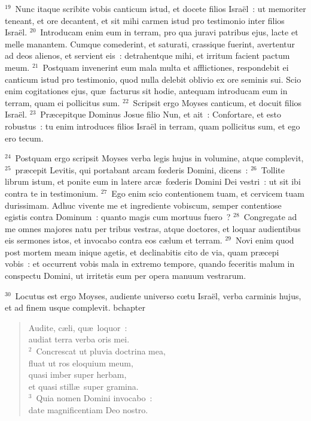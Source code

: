 ${}^{19}$~Nunc itaque scribite vobis canticum istud, et docete filios Isra\"el~: ut memoriter teneant, et ore decantent, et sit mihi carmen istud pro testimonio inter filios Isra\"el.
${}^{20}$~Introducam enim eum in terram, pro qua juravi patribus ejus, lacte et melle manantem. Cumque comederint, et saturati, crassique fuerint, avertentur ad deos alienos, et servient eis~: detrahentque mihi, et irritum facient pactum meum.
${}^{21}$~Postquam invenerint eum mala multa et afflictiones, respondebit ei canticum istud pro testimonio, quod nulla delebit oblivio ex ore seminis sui. Scio enim cogitationes ejus, qu\ae\ facturus sit hodie, antequam introducam eum in terram, quam ei pollicitus sum.
${}^{22}$~Scripsit ergo Moyses canticum, et docuit filios Isra\"el.
${}^{23}$~Pr\ae cepitque Dominus Josue filio Nun, et ait~: Confortare, et esto robustus~: tu enim introduces filios Isra\"el in terram, quam pollicitus sum, et ego ero tecum.


${}^{24}$~Postquam ergo scripsit Moyses verba legis hujus in volumine, atque complevit,
${}^{25}$~pr\ae cepit Levitis, qui portabant arcam fœderis Domini, dicens~:
${}^{26}$~Tollite librum istum, et ponite eum in latere arc\ae\ fœderis Domini Dei vestri~: ut sit ibi contra te in testimonium.
${}^{27}$~Ego enim scio contentionem tuam, et cervicem tuam durissimam. Adhuc vivente me et ingrediente vobiscum, semper contentiose egistis contra Dominum~: quanto magis cum mortuus fuero~?
${}^{28}$~Congregate ad me omnes majores natu per tribus vestras, atque doctores, et loquar audientibus eis sermones istos, et invocabo contra eos c\ae lum et terram.
${}^{29}$~Novi enim quod post mortem meam inique agetis, et declinabitis cito de via, quam pr\ae cepi vobis~: et occurrent vobis mala in extremo tempore, quando feceritis malum in conspectu Domini, ut irritetis eum per opera manuum vestrarum.


${}^{30}$~Locutus est ergo Moyses, audiente universo cœtu Isra\"el, verba carminis hujus, et ad finem usque complevit.
bchapter\begin{flushleft}\begin{verse}\vspace{-19pt}\hspace{6pt}Audite, c\ae li, qu\ae\ loquor~:\\\hspace{6pt} audiat terra verba oris mei.\\
${}^{2}$~Concrescat ut pluvia doctrina mea,\\ fluat ut ros eloquium meum,\\ quasi imber super herbam,\\ et quasi still\ae\ super gramina.\\
${}^{3}$~Quia nomen Domini invocabo~:\\ date magnificentiam Deo nostro.\end{verse}\end{flushleft}


